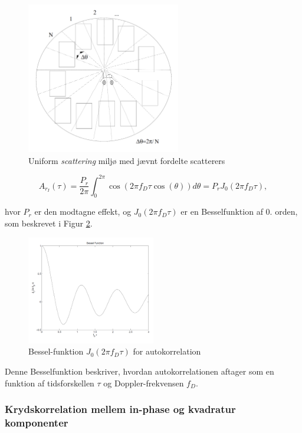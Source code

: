 \documentclass[a4paper,12pt]{book}
\begin{document}
	\begin{figure}[h!]
		\centering
		\includegraphics[width=0.6\textwidth]{fig/fig18.png}
		\caption{Uniform \textit{scattering} miljø med jævnt fordelte scatterers}
		\label{fig:uniform_scattering}
	\end{figure}
	
	\[
	A_{r_I}(\tau) = \frac{P_r}{2\pi} \int_0^{2\pi} \cos(2\pi f_D \tau \cos(\theta)) d\theta = P_r J_0(2\pi f_D \tau),
	\]
	
	hvor $P_r$ er den modtagne effekt, og $J_0(2\pi f_D \tau)$ er en Besselfunktion af 0. orden, som beskrevet i Figur \ref{fig:bessel_function}.
	
	\begin{figure}[h!]
		\centering
		\includegraphics[width=0.5\textwidth]{fig/fig19.png}
		\caption{Bessel-funktion $J_0(2\pi f_D \tau)$ for autokorrelation}
		\label{fig:bessel_function}
	\end{figure}
	
	Denne Besselfunktion beskriver, hvordan autokorrelationen aftager som en funktion af tidsforskellen $\tau$ og Doppler-frekvensen $f_D$.
	
	\subsubsection{Krydskorrelation mellem in-phase og kvadratur komponenter}
	
\end{document}
